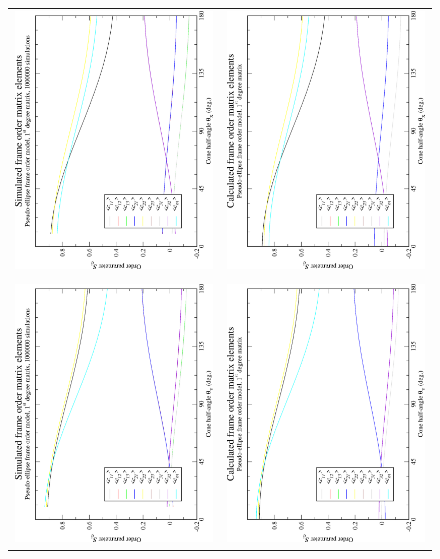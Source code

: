 \begin{figure}
\centering
  \begin{tabular}{@{}cc@{}}
    \includegraphics[width=.35\textwidth,angle=270]{images/frame_order_matrix/Sij_pseudo-ellipse_out_of_frame_theta_x_ens1000000.eps} &
    \includegraphics[width=.35\textwidth,angle=270]{images/frame_order_matrix/Sij_pseudo-ellipse_out_of_frame_theta_x_calc.eps} \\
    \\[-5pt]
    \includegraphics[width=.35\textwidth,angle=270]{images/frame_order_matrix/Sij_pseudo-ellipse_out_of_frame_theta_y_ens1000000.eps} &
    \includegraphics[width=.35\textwidth,angle=270]{images/frame_order_matrix/Sij_pseudo-ellipse_out_of_frame_theta_y_calc.eps} \\

\end{tabular}
\end{figure}
